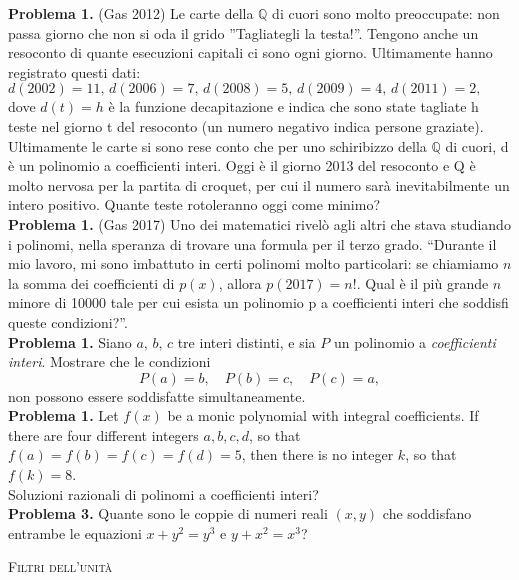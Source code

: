 \documentclass[a4paper]{article}
\theoremstyle{remark}
\theoremstyle{definition}
\begin{document}
\begin{multicols}{2}
	\textbf{Problema 1.} (Gas 2012) Le carte della $ \mathbb{Q} $ di cuori sono molto preoccupate: non passa giorno che non si oda il grido ”Tagliategli la testa!”. Tengono anche un resoconto
	di quante esecuzioni capitali ci sono ogni giorno. Ultimamente hanno registrato questi dati:
	$ d(2002) = 11, \, 
	d(2006) = 7, \, 
	d(2008) = 5,\, 
	d(2009) = 4,\,
	d(2011) = 2 ,\, 
	 $ dove $ d(t) = h $ è la funzione decapitazione e indica che sono state tagliate h teste nel giorno t del resoconto (un numero negativo indica persone
	graziate). Ultimamente le carte si sono rese conto che per uno schiribizzo della $ \mathbb{Q} $ di cuori, d è un polinomio a coefficienti interi. Oggi è il
	giorno 2013 del resoconto e Q è molto nervosa per la partita di croquet, per cui il numero sarà inevitabilmente un intero positivo. Quante teste
	rotoleranno oggi come minimo? \\
	
	
	\textbf{Problema 1.} (Gas 2017) Uno dei matematici rivelò agli altri che stava studiando i polinomi, nella speranza di trovare una formula per il terzo grado.
	“Durante il mio lavoro, mi sono imbattuto in certi polinomi molto particolari: se chiamiamo $ n $ la somma dei coefficienti di
	$ p(x) $, allora $ p(2017) = n! $. Qual è il più grande $ n  $ minore di 10000 tale per cui esista un polinomio p a coefficienti interi che
	soddisfi queste condizioni?”. \\
	
	\textbf{Problema 1.} Siano $ a,\, b,\, c $ tre interi distinti, e sia $ P $ un polinomio a \emph{coefficienti interi}. Mostrare che le condizioni $$  P(a) = b,\quad P(b) = c,\quad P(c) = a,  $$ non possono essere soddisfatte simultaneamente. \\
	
	\textbf{Problema 1.} Let $ f (x) $ be a monic polynomial with integral coefficients. If there are four different
	integers $ a, b, c, d $, so that $ f (a) = f (b) = f (c) = f (d) = 5 $, then there is no
	integer $ k $, so that $ f (k) = 8 $. \\
	
	Soluzioni razionali di polinomi a coefficienti interi? \\
	
	\textbf{Problema 3.} Quante sono le coppie di numeri reali $ (x,y) $ che soddisfano entrambe le equazioni $ x + y^2 = y^3 $ e $ y + x^2 = x^3 $?
	
	\begin{center}
		\textsc{Filtri dell'unità}
	\end{center}
	

\end{multicols}
\end{document}
